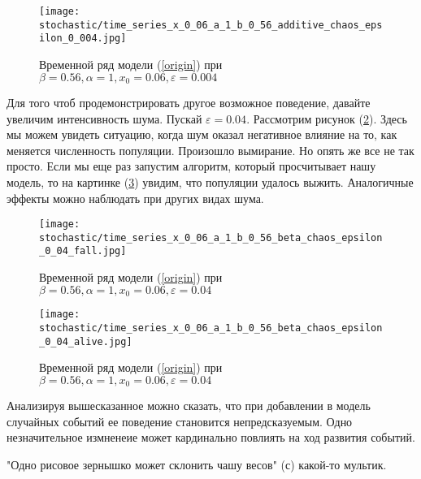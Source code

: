         \begin{figure}
            \centering
            \texttt{[image: stochastic/time\_series\_x\_0\_06\_a\_1\_b\_0\_56\_additive\_chaos\_epsilon\_0\_004.jpg]}
        
            \captionsetup{justification=centering}
            \caption{Временной ряд модели (\ref{origin}) при \(\beta = 0.56, \alpha = 1, x_0 = 0.06, \varepsilon = 0.004\)}
            \label{time_series_x_0_06_a_1_b_0_56_additive_chaos_epsilon_0_004}
        \end{figure}

        Для того чтоб продемонстрировать другое возможное поведение, давайте увеличим интенсивность шума. Пускай \(\varepsilon = 0.04\). Рассмотрим рисунок (\ref{time_series_x_0_06_a_1_b_0_56_beta_chaos_epsilon_0_04_fall}). Здесь мы можем увидеть ситуацию, когда шум оказал негативное влияние на то, как меняется численность популяции. Произошло вымирание. Но опять же все не так просто. Если мы еще раз запустим алгоритм, который просчитывает нашу модель, то на картинке (\ref{time_series_x_0_06_a_1_b_0_56_beta_chaos_epsilon_0_04_alive}) увидим, что популяции удалось выжить. Аналогичные эффекты можно наблюдать при других видах шума.

        \begin{figure}
            \centering
            \texttt{[image: stochastic/time\_series\_x\_0\_06\_a\_1\_b\_0\_56\_beta\_chaos\_epsilon\_0\_04\_fall.jpg]}
        
            \captionsetup{justification=centering}
            \caption{Временной ряд модели (\ref{origin}) при \(\beta = 0.56, \alpha = 1, x_0 = 0.06, \varepsilon = 0.04\)}
            \label{time_series_x_0_06_a_1_b_0_56_beta_chaos_epsilon_0_04_fall}
        \end{figure}

        \begin{figure}
            \centering
            \texttt{[image: stochastic/time\_series\_x\_0\_06\_a\_1\_b\_0\_56\_beta\_chaos\_epsilon\_0\_04\_alive.jpg]}
        
            \captionsetup{justification=centering}
            \caption{Временной ряд модели (\ref{origin}) при \(\beta = 0.56, \alpha = 1, x_0 = 0.06, \varepsilon = 0.04\)}
            \label{time_series_x_0_06_a_1_b_0_56_beta_chaos_epsilon_0_04_alive}
        \end{figure}

        Анализируя вышесказанное можно сказать, что при добавлении в модель случайных событий ее поведение становится непредсказуемым. Одно незначительное измненеие может кардинально повлиять на ход развития событий. 

        "Одно рисовое зернышко может склонить чашу весов" (с) какой-то мультик.


